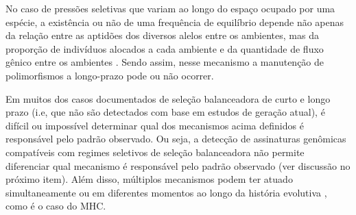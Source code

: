 \begin{refsection}
No caso de pressões seletivas que variam ao longo do espaço ocupado por uma espécie, a existência ou não de uma frequência de equilíbrio depende não apenas da relação entre as aptidões dos diversos alelos entre os ambientes, mas da proporção de indivíduos alocados a cada ambiente e da quantidade de fluxo gênico entre os ambientes \parencite{Gloss2016,Charlesworth2010}. Sendo assim, nesse mecanismo a manutenção de polimorfismos a longo-prazo pode ou não ocorrer.

Em muitos dos casos documentados de seleção balanceadora de curto e longo prazo (i.e, que não são detectados com base em estudos de geração atual), é difícil ou impossível determinar qual dos mecanismos  acima definidos é responsável pelo padrão observado. Ou seja, a detecção de assinaturas genômicas compatíveis com regimes seletivos de seleção balanceadora não permite diferenciar qual mecanismo é responsável pelo padrão observado (ver discussão no próximo item). Além disso, múltiplos mecanismos podem ter atuado simultaneamente ou em diferentes momentos ao longo da história evolutiva \parencite{Hedrick2012}, como é o caso do MHC.



\end{refsection}
